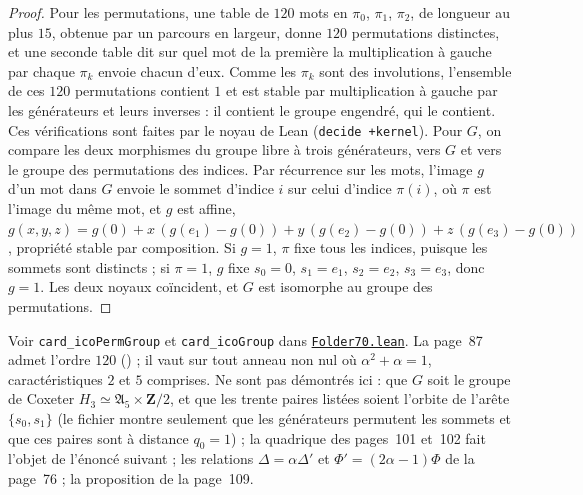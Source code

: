 \begin{proof}
Pour les permutations, une table de $120$ mots en $\pi_0$, $\pi_1$, $\pi_2$, de longueur au plus $15$, obtenue par un parcours en largeur, donne $120$ permutations distinctes, et une seconde table dit sur quel mot de la première la multiplication à gauche par chaque $\pi_k$ envoie chacun d'eux. Comme les $\pi_k$ sont des involutions, l'ensemble de ces $120$ permutations contient $1$ et est stable par multiplication à gauche par les générateurs et leurs inverses : il contient le groupe engendré, qui le contient. Ces vérifications sont faites par le noyau de Lean (\texttt{decide +kernel}). Pour $G$, on compare les deux morphismes du groupe libre à trois générateurs, vers $G$ et vers le groupe des permutations des indices. Par récurrence sur les mots, l'image $g$ d'un mot dans $G$ envoie le sommet d'indice $i$ sur celui d'indice $\pi(i)$, où $\pi$ est l'image du même mot, et $g$ est affine, $g(x, y, z) = g(0) + x\,(g(e_1) - g(0)) + y\,(g(e_2) - g(0)) + z\,(g(e_3) - g(0))$, propriété stable par composition. Si $g = 1$, $\pi$ fixe tous les indices, puisque les sommets sont distincts ; si $\pi = 1$, $g$ fixe $s_0 = 0$, $s_1 = e_1$, $s_2 = e_2$, $s_3 = e_3$, donc $g = 1$. Les deux noyaux coïncident, et $G$ est isomorphe au groupe des permutations.
\end{proof}

Voir \texttt{card\_icoPermGroup} et \texttt{card\_icoGroup} dans \href{\leanblob/Geometry/Folder70.lean}{\texttt{Folder70.\allowbreak{}lean}}. La page~87 admet l'ordre $120$ () ; il vaut sur tout anneau non nul où $\alpha^2 + \alpha = 1$, caractéristiques $2$ et $5$ comprises. Ne sont pas démontrés ici : que $G$ soit le groupe de Coxeter $H_3 \simeq \mathfrak A_5 \times \mathbf Z/2$, et que les trente paires listées soient l'orbite de l'arête $\{s_0, s_1\}$ (le fichier montre seulement que les générateurs permutent les sommets et que ces paires sont à distance $q_0 = 1$) ; la quadrique des pages~101 et~102 fait l'objet de l'énoncé suivant ; les relations $\Delta = \alpha\Delta'$ et $\Phi' = (2\alpha - 1)\Phi$ de la page~76 ; la proposition  de la page~109.


